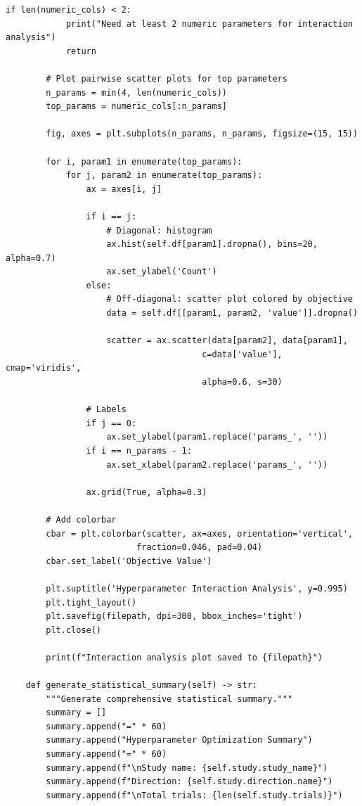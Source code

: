 \begin{lstlisting}[style=python, caption=Comprehensive HPO analysis and visualization]
        if len(numeric_cols) < 2:
            print("Need at least 2 numeric parameters for interaction analysis")
            return

        # Plot pairwise scatter plots for top parameters
        n_params = min(4, len(numeric_cols))
        top_params = numeric_cols[:n_params]

        fig, axes = plt.subplots(n_params, n_params, figsize=(15, 15))

        for i, param1 in enumerate(top_params):
            for j, param2 in enumerate(top_params):
                ax = axes[i, j]

                if i == j:
                    # Diagonal: histogram
                    ax.hist(self.df[param1].dropna(), bins=20, alpha=0.7)
                    ax.set_ylabel('Count')
                else:
                    # Off-diagonal: scatter plot colored by objective
                    data = self.df[[param1, param2, 'value']].dropna()

                    scatter = ax.scatter(data[param2], data[param1],
                                       c=data['value'], cmap='viridis',
                                       alpha=0.6, s=30)

                # Labels
                if j == 0:
                    ax.set_ylabel(param1.replace('params_', ''))
                if i == n_params - 1:
                    ax.set_xlabel(param2.replace('params_', ''))

                ax.grid(True, alpha=0.3)

        # Add colorbar
        cbar = plt.colorbar(scatter, ax=axes, orientation='vertical',
                          fraction=0.046, pad=0.04)
        cbar.set_label('Objective Value')

        plt.suptitle('Hyperparameter Interaction Analysis', y=0.995)
        plt.tight_layout()
        plt.savefig(filepath, dpi=300, bbox_inches='tight')
        plt.close()

        print(f"Interaction analysis plot saved to {filepath}")

    def generate_statistical_summary(self) -> str:
        """Generate comprehensive statistical summary."""
        summary = []
        summary.append("=" * 60)
        summary.append("Hyperparameter Optimization Summary")
        summary.append("=" * 60)
        summary.append(f"\nStudy name: {self.study.study_name}")
        summary.append(f"Direction: {self.study.direction.name}")
        summary.append(f"\nTotal trials: {len(self.study.trials)}")


\end{lstlisting}
